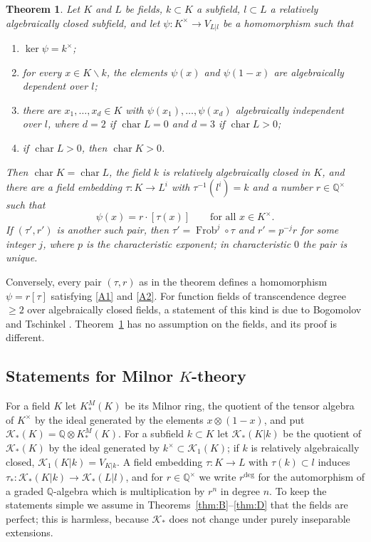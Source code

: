 \documentclass[11pt]{amsart}
\newtheorem{thmx}{Theorem}
\theoremstyle{definition}
\theoremstyle{remark}
\newcommand{\QQ}{\mathbb{Q}}
\newcommand{\Frob}{\operatorname{Frob}}
\newcommand{\chr}{\operatorname{char}}
\newcommand{\sm}{\smallsetminus}
\newcommand{\KM}{K^{M}}
\newcommand{\Kr}{\mathcal{K}}
\begin{document}
\begin{thmx}\label{thm:A}
Let $K$ and $L$ be fields, $k\subset K$ a subfield, $l\subset L$ a relatively algebraically closed subfield, and let $\psi\colon K^\times\to V_{L|l}$ be a homomorphism such that
\begin{enumerate}[label=\textup{(A\arabic*)}]
\item\label{A1} $\ker\psi=k^\times$;
\item\label{A2} for every $x\in K\sm k$, the elements $\psi(x)$ and $\psi(1-x)$ are algebraically dependent over $l$;
\item\label{A3} there are $x_1,\dots,x_d\in K$ with $\psi(x_1),\dots,\psi(x_d)$ algebraically independent over $l$, where $d=2$ if $\chr L=0$ and $d=3$ if $\chr L>0$;
\item\label{A4} if $\chr L>0$, then $\chr K>0$.
\end{enumerate}
Then $\chr K=\chr L$, the field $k$ is relatively algebraically closed in $K$, and there are a field embedding $\tau\colon K\to L^i$ with $\tau^{-1}(l^i)=k$ and a number $r\in\QQ^\times$ such that
\[ \psi(x)=r\cdot[\tau(x)]\qquad\text{for all }x\in K^\times . \]
If $(\tau',r')$ is another such pair, then $\tau'=\Frob^j\circ\tau$ and $r'=p^{-j}r$ for some integer $j$, where $p$ is the characteristic exponent; in characteristic $0$ the pair is unique.
\end{thmx}

Conversely, every pair $(\tau,r)$ as in the theorem defines a homomorphism $\psi=r[\tau]$ satisfying \ref{A1} and \ref{A2}.
For function fields of transcendence degree $\ge2$ over algebraically closed fields, a statement of this kind is due to Bogomolov and Tschinkel \cite{BT}.
Theorem~\ref{thm:A} has no assumption on the fields, and its proof is different.

\subsection{Statements for Milnor \texorpdfstring{$K$}{K}-theory}
For a field $K$ let $\KM_*(K)$ be its Milnor ring, the quotient of the tensor algebra of $K^\times$ by the ideal generated by the elements $x\otimes(1-x)$, and put $\Kr_*(K)=\QQ\otimes\KM_*(K)$.
For a subfield $k\subset K$ let $\Kr_*(K|k)$ be the quotient of $\Kr_*(K)$ by the ideal generated by $k^\times\subset\Kr_1(K)$; if $k$ is relatively algebraically closed, $\Kr_1(K|k)=V_{K|k}$.
A field embedding $\tau\colon K\to L$ with $\tau(k)\subset l$ induces $\tau_*\colon\Kr_*(K|k)\to\Kr_*(L|l)$, and for $r\in\QQ^\times$ we write $r^{\deg}$ for the automorphism of a graded $\QQ$-algebra which is multiplication by $r^n$ in degree $n$.
To keep the statements simple we assume in Theorems~\ref{thm:B}--\ref{thm:D} that the fields are perfect; this is harmless, because $\Kr_*$ does not change under purely inseparable extensions.
\end{document}
